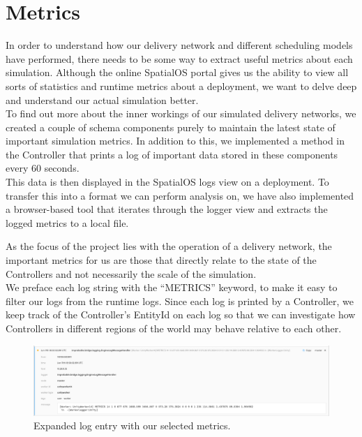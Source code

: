 \documentclass[a4paper,11pt,titlepage]{report}
\begin{document}
\section{Metrics}
In order to understand how our delivery network and different scheduling models have performed, there needs to be some way to extract useful metrics about each simulation. Although the online SpatialOS portal gives us the ability to view all sorts of statistics and runtime metrics about a deployment, we want to delve deep and understand our actual simulation better.\\

To find out more about the inner workings of our simulated delivery networks, we created a couple of schema components purely to maintain the latest state of important simulation metrics. In addition to this, we implemented a method in the Controller that prints a log of important data stored in these components every 60 seconds.\\

This data is then displayed in the SpatialOS logs view on a deployment. To transfer this into a format we can perform analysis on, we have also implemented a browser-based tool that iterates through the logger view and extracts the logged metrics to a local file.

As the focus of the project lies with the operation of a delivery network, the important metrics for us are those that directly relate to the state of the Controllers and not necessarily the scale of the simulation.\\

We preface each log string with the ``METRICS'' keyword, to make it easy to filter our logs from the runtime logs. Since each log is printed by a Controller, we keep track of the Controller's EntityId on each log so that we can investigate how Controllers in different regions of the world may behave relative to each other.

\begin{figure}[!hbpt]
  \center
  \includegraphics[width=\linewidth]{img/example_log_view_full.png}
  \caption{Expanded log entry with our selected metrics.}
  \label{fig:example_log_view_full}
\end{figure}
\end{document}
